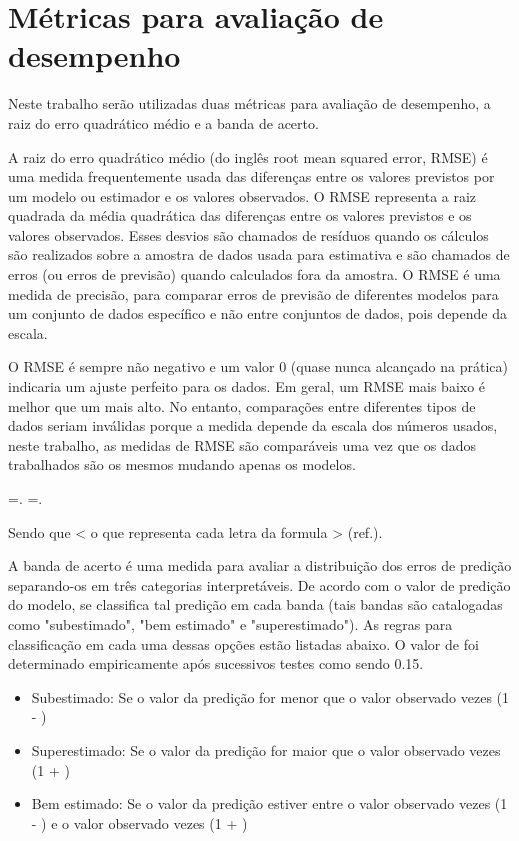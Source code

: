 \section{Métricas para avaliação de desempenho}
\label{sec:metricas_avaliacao}

Neste trabalho serão utilizadas duas métricas para avaliação de desempenho, a raiz do erro quadrático médio e a banda de acerto.

A raiz do erro quadrático médio (do inglês root mean squared error, RMSE) é uma medida frequentemente usada das diferenças entre os valores previstos por um modelo ou estimador e os valores observados. O RMSE representa a raiz quadrada da média quadrática das diferenças entre os valores previstos e os valores observados. Esses desvios são chamados de resíduos quando os cálculos são realizados sobre a amostra de dados usada para estimativa e são chamados de erros (ou erros de previsão) quando calculados fora da amostra. O RMSE é uma medida de precisão, para comparar erros de previsão de diferentes modelos para um conjunto de dados específico e não entre conjuntos de dados, pois depende da escala.

O RMSE é sempre não negativo e um valor 0 (quase nunca alcançado na prática) indicaria um ajuste perfeito para os dados. Em geral, um RMSE mais baixo é melhor que um mais alto. No entanto, comparações entre diferentes tipos de dados seriam inválidas porque a medida depende da escala dos números usados, neste trabalho, as medidas de RMSE são comparáveis uma vez que os dados trabalhados são os mesmos mudando apenas os modelos.

{\displaystyle {} ={}.}{\displaystyle {} ={}.}

Sendo que < o que representa cada letra da formula > (ref.).

A banda de acerto é uma medida para avaliar a distribuição dos erros de predição separando-os em três categorias interpretáveis. De acordo com o valor de predição do modelo, se classifica tal predição em cada banda (tais bandas são catalogadas como "subestimado", "bem estimado" e "superestimado"). As regras para classificação em cada uma dessas opções estão listadas abaixo. O valor de \delta foi determinado empiricamente após sucessivos testes como sendo 0.15.

\begin{itemize}
	\item Subestimado: Se o valor da predição for menor que o valor observado vezes (1 - \delta)
	\item Superestimado: Se o valor da predição for maior que o valor observado vezes (1 + \delta)
	\item Bem estimado: Se o valor da predição estiver entre o valor observado vezes (1 - \delta) e o valor observado vezes (1 + \delta)
\end{itemize}

